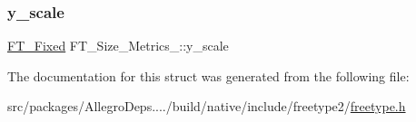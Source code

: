 \subsubsection{\texorpdfstring{y\+\_\+scale}{y\_scale}}
{\footnotesize\ttfamily \hyperlink{fttypes_8h_a5f5a679cc09f758efdd0d1c5feed3c3d}{F\+T\+\_\+\+Fixed} F\+T\+\_\+\+Size\+\_\+\+Metrics\+\_\+\+::y\+\_\+scale}



The documentation for this struct was generated from the following file\+:\begin{DoxyCompactItemize}
\item 
src/packages/\+Allegro\+Deps..../build/native/include/freetype2/\hyperlink{freetype_8h}{freetype.\+h}\end{DoxyCompactItemize}
